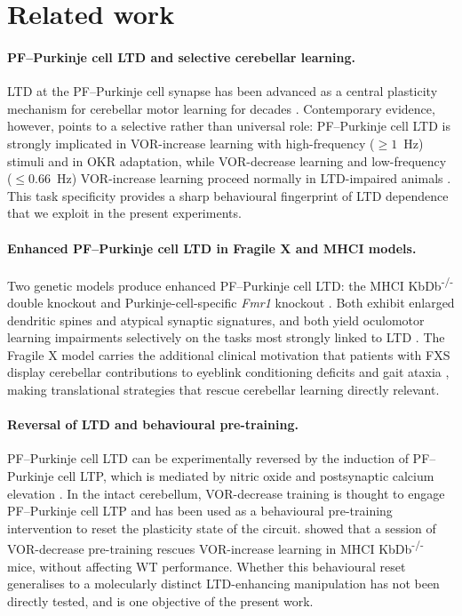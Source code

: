 \documentclass[11pt]{article}
\begin{document}
\section{Related work}

\paragraph{PF--Purkinje cell LTD and selective cerebellar learning.}
LTD at the PF--Purkinje cell synapse has been advanced as a central plasticity
mechanism for cerebellar motor learning for decades
\citep{boyden2004cerebellum}. Contemporary evidence, however, points to a
selective rather than universal role: PF--Purkinje cell LTD is strongly
implicated in VOR-increase learning with high-frequency ($\geq 1$~Hz)
stimuli and in OKR adaptation, while VOR-decrease learning and low-frequency
($\leq 0.66$~Hz) VOR-increase learning proceed normally in LTD-impaired
animals \citep{boyden2004cerebellum, raymond2018cerebellum, kimpo2005vor,
kimpo2014gating, inoshita2018okr, takeuchi2008delphilin, rowan2018graded,
nguyenvu2017saturation}. This task specificity provides a sharp behavioural
fingerprint of LTD dependence that we exploit in the present experiments.

\paragraph{Enhanced PF--Purkinje cell LTD in Fragile X and MHCI models.}
Two genetic models produce enhanced PF--Purkinje cell LTD: the
MHCI KbDb\textsuperscript{-/-} double knockout and Purkinje-cell-specific
\textit{Fmr1} knockout \citep{koekkoek2005fmr1, nosyreva2006fmr1,
nguyenvu2017saturation}. Both exhibit enlarged dendritic spines and atypical
synaptic signatures, and both yield oculomotor learning impairments
selectively on the tasks most strongly linked to LTD
\citep{nguyenvu2017saturation, koekkoek2005fmr1}. The Fragile X model
carries the additional clinical motivation that patients with FXS display
cerebellar contributions to eyeblink conditioning deficits and gait ataxia
\citep{koekkoek2005fmr1}, making translational strategies that rescue
cerebellar learning directly relevant.

\paragraph{Reversal of LTD and behavioural pre-training.}
PF--Purkinje cell LTD can be experimentally reversed by the induction of
PF--Purkinje cell LTP, which is mediated by nitric oxide and postsynaptic
calcium elevation \citep{levram2003reversing}. In the intact cerebellum,
VOR-decrease training is thought to engage PF--Purkinje cell LTP and has
been used as a behavioural pre-training intervention to reset the plasticity
state of the circuit. \citet{nguyenvu2017saturation} showed that a session
of VOR-decrease pre-training rescues VOR-increase learning in
MHCI KbDb\textsuperscript{-/-} mice, without affecting WT performance.
Whether this behavioural reset generalises to a molecularly distinct
LTD-enhancing manipulation has not been directly tested, and is one
objective of the present work.
\end{document}
